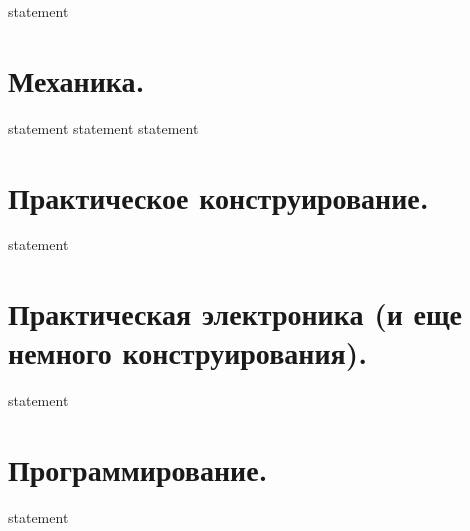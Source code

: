 {statement}

\section{Механика.}

{statement}
{statement}
{statement}

\section{Практическое конструирование.}

{statement}

\section{Практическая электроника (и еще немного конструирования).}

{statement}

\section{Программирование.}

{statement}
